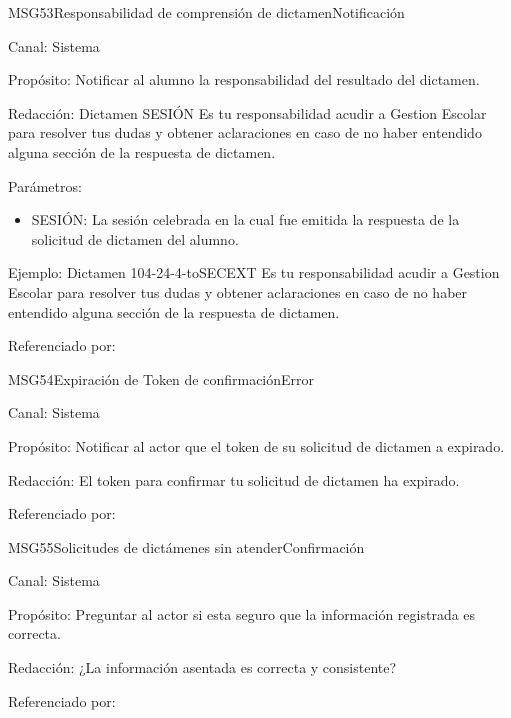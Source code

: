 \begin{mensaje}{MSG53}{Responsabilidad de comprensión de dictamen}{Notificación}
	\item[Canal:] Sistema
	\item[Propósito:] Notificar al alumno la responsabilidad del resultado del dictamen.
	\item[Redacción:] Dictamen SESIÓN  Es tu responsabilidad acudir a Gestion Escolar para resolver tus dudas y obtener aclaraciones en caso de no haber entendido alguna sección de la respuesta de dictamen.
	\item[Parámetros:] 
	\begin{itemize}
		\item SESIÓN: La sesión celebrada en la cual fue emitida la respuesta de la solicitud de dictamen del alumno.
	\end{itemize}
	\item[Ejemplo:]	Dictamen 104-24-4-toSECEXT  Es tu responsabilidad acudir a Gestion Escolar para resolver tus dudas y obtener aclaraciones en caso de no haber entendido alguna sección de la respuesta de dictamen.
	\item[Referenciado por: ] 
\end{mensaje}

\begin{mensaje}{MSG54}{Expiración de Token de confirmación}{Error}
	\item[Canal:] Sistema
	\item[Propósito:] Notificar al actor que el token de su solicitud de dictamen a expirado.
	\item[Redacción:] El token para confirmar tu solicitud de dictamen ha expirado.
	\item[Referenciado por: ] 
\end{mensaje}

\begin{mensaje}{MSG55}{Solicitudes de dictámenes sin atender}{Confirmación}
	\item[Canal:] Sistema
	\item[Propósito:] Preguntar al actor si esta seguro que la información registrada es correcta.
	\item[Redacción:] ¿La información asentada es correcta y consistente?
	\item[Referenciado por: ] 
\end{mensaje}

